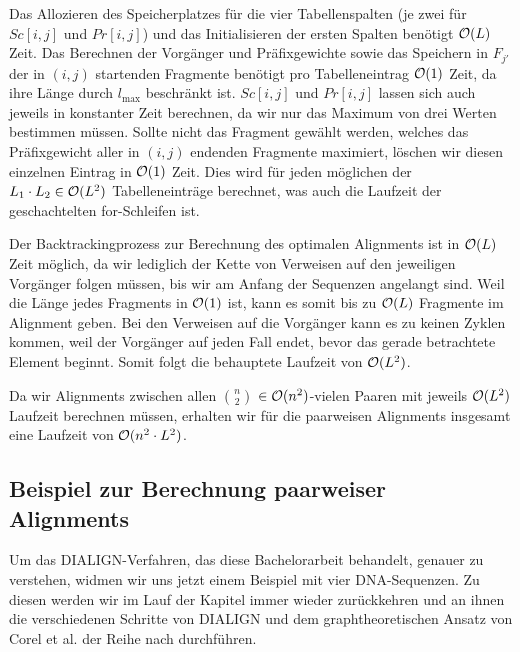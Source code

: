 \begin{beweis}
	Das Allozieren des Speicherplatzes für die vier Tabellenspalten (je zwei für $Sc[i,j]$ und $Pr[i,j]$) und das Initialisieren der ersten Spalten benötigt $\mathcal{O}(L)$ Zeit. Das Berechnen der Vorgänger und Präfixgewichte sowie das Speichern in $F_{j'}$ der in $(i,j)$ startenden Fragmente benötigt pro Tabelleneintrag $\mathcal{O}(1)$ Zeit, da ihre Länge durch $l_{\max}$ beschränkt ist. $Sc[i,j]$ und $Pr[i,j]$ lassen sich auch jeweils in konstanter Zeit berechnen, da wir nur das Maximum von drei Werten bestimmen müssen. Sollte nicht das Fragment gewählt werden, welches das Präfixgewicht aller in $(i,j)$ endenden Fragmente maximiert, löschen wir diesen einzelnen Eintrag in $\mathcal{O}(1)$ Zeit. Dies wird für jeden möglichen der $L_1 \cdot L_2 \in \mathcal{O}(L^2)$ Tabelleneinträge berechnet, was auch die Laufzeit der geschachtelten for-Schleifen ist.
	
	Der Backtrackingprozess zur Berechnung des optimalen Alignments ist in $\mathcal{O}(L)$ Zeit möglich, da wir lediglich der Kette von Verweisen auf den jeweiligen Vorgänger folgen müssen, bis wir am Anfang der Sequenzen angelangt sind. Weil die Länge jedes Fragments in $\mathcal{O}(1)$ ist, kann es somit bis zu $\mathcal{O}(L)$ Fragmente im Alignment geben. Bei den Verweisen auf die Vorgänger kann es zu keinen Zyklen kommen, weil der Vorgänger auf jeden Fall endet, bevor das gerade betrachtete Element beginnt. Somit folgt die behauptete Laufzeit von $\mathcal{O}(L^2)$.
\end{beweis}

Da wir Alignments zwischen allen ${n}\choose{2}$ $\in \mathcal{O}(n^2)$-vielen Paaren mit jeweils $\mathcal{O}(L^2)$ Laufzeit berechnen müssen, erhalten wir für die paarweisen Alignments insgesamt eine Laufzeit von $\mathcal{O}(n^2\cdot L^2)$.

\subsection{Beispiel zur Berechnung paarweiser Alignments} 
Um das DIALIGN-Verfahren, das diese Bachelorarbeit behandelt, genauer zu verstehen, widmen wir uns jetzt einem Beispiel mit vier DNA-Sequenzen. Zu diesen werden wir im Lauf der Kapitel immer wieder zurückkehren und an ihnen die verschiedenen Schritte von DIALIGN und dem graphtheoretischen Ansatz von Corel et al. der Reihe nach durchführen.


